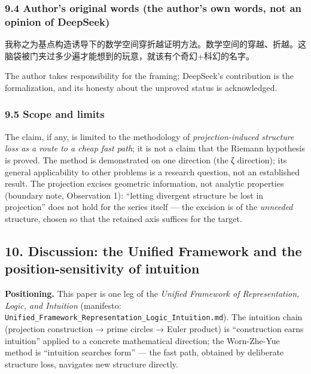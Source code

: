 \documentclass[
]{article}
\begin{document}
\subsubsection{9.4 Author's original words (the author's own words, not
an opinion of
DeepSeek)}\label{authors-original-words-the-authors-own-words-not-an-opinion-of-deepseek}

我称之为基点构造诱导下的数学空间穿折越证明方法。数学空间的穿越、折越。这脑袋被门夹过多少遍才能想到的玩意，就该有个奇幻+科幻的名字。

The author takes responsibility for the framing; DeepSeek's contribution
is the formalization, and its honesty about the unproved status is
acknowledged.

\subsubsection{9.5 Scope and limits}\label{scope-and-limits}

The claim, if any, is limited to the methodology of
\emph{projection-induced structure loss as a route to a cheap fast
path}; it is not a claim that the Riemann hypothesis is proved. The
method is demonstrated on one direction (the ζ direction); its general
applicability to other problems is a research question, not an
established result. The projection excises geometric information, not
analytic properties (boundary note, Observation 1): ``letting divergent
structure be lost in projection'' does not hold for the series itself
--- the excision is of the \emph{unneeded} structure, chosen so that the
retained axis suffices for the target.

\subsection{10. Discussion: the Unified Framework and the
position-sensitivity of
intuition}\label{discussion-the-unified-framework-and-the-position-sensitivity-of-intuition}

\textbf{Positioning.} This paper is one leg of the \emph{Unified
Framework of Representation, Logic, and Intuition} (manifesto:
\texttt{Unified\_Framework\_Representation\_Logic\_Intuition.md}). The
intuition chain (projection construction → prime circles → Euler
product) is ``construction earns intuition'' applied to a concrete
mathematical direction; the Worn-Zhe-Yue method is ``intuition searches
form'' --- the fast path, obtained by deliberate structure loss,
navigates new structure directly.
\end{document}
